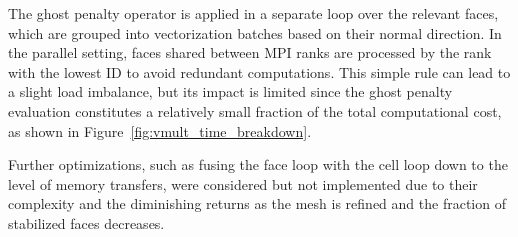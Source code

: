 \documentclass[11pt,a4paper]{article}
\begin{document}
The ghost penalty operator is applied in a separate loop over the relevant faces, which are grouped into vectorization
batches based on their normal direction. In the parallel setting, faces shared between MPI ranks are processed by the
rank with the lowest ID to avoid redundant computations. This simple rule can lead to a slight load imbalance, but its
impact is limited since the ghost penalty evaluation constitutes a relatively small fraction of the total computational
cost, as shown in Figure~\ref{fig:vmult_time_breakdown}.


Further optimizations, such as fusing the face loop with the cell loop down to the level of memory transfers, were
considered but not implemented due to their complexity and the diminishing returns as the mesh is refined and the
fraction of stabilized faces decreases.
\end{document}
